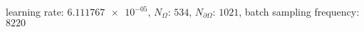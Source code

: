 learning rate: $\num[scientific-notation=true]{6.111767e-05}$, $N_{\Omega}$: $\num[scientific-notation=false]{534}$, $N_{\partial\Omega}$: $\num[scientific-notation=false]{1021}$, batch sampling frequency: $\num[scientific-notation=false]{8220}$